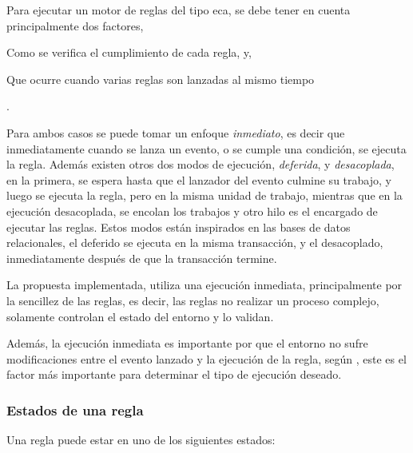 Para ejecutar un motor de reglas del tipo \gls{eca}, se debe tener en cuenta
principalmente dos factores, 
\begin{enumerate*}[label=\itshape\alph*\upshape)]
\item  Como se verifica el cumplimiento de cada regla, y, 
\item  Que ocurre cuando varias reglas son lanzadas al mismo tiempo
\end{enumerate*}.

Para ambos casos se puede tomar un enfoque \emph{inmediato}, es decir que
inmediatamente cuando se lanza un evento, o se cumple una condición, se ejecuta
la regla. Además existen otros dos modos de ejecución, \emph{deferida}, y
\emph{desacoplada}, en la primera, se espera hasta que el lanzador del evento
culmine su trabajo, y luego se ejecuta la regla, pero en la misma unidad de
trabajo, mientras que en la ejecución desacoplada, se encolan los trabajos y
otro hilo es el encargado de ejecutar las reglas. Estos modos están inspirados
en las bases de datos relacionales, el deferido se ejecuta en la misma
transacción, y el desacoplado, inmediatamente después de que la transacción
termine\cite{bailey2004event}.

La propuesta implementada, utiliza una ejecución inmediata, principalmente por
la sencillez de las reglas, es decir, las reglas no realizar un proceso complejo,
solamente controlan el estado del entorno y lo validan.

Además, la ejecución inmediata es importante por que el entorno no sufre
modificaciones entre el evento lanzado y la ejecución de la regla, según
\cite{bailey2004event}, este es el factor más importante para determinar el tipo
de ejecución deseado.



\subsubsection{Estados de una regla}

Una regla puede estar en uno de los siguientes estados:

